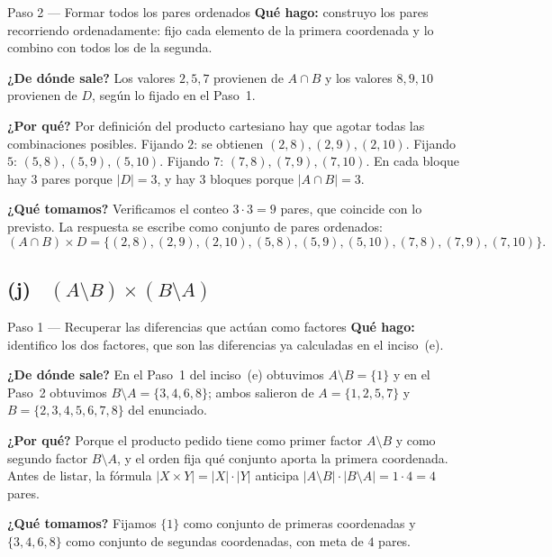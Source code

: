 \documentclass[11pt]{article}
\begin{document}
\begin{paso}{Paso 2 --- Formar todos los pares ordenados}
\textbf{Qué hago:} construyo los pares recorriendo ordenadamente: fijo cada elemento de la
primera coordenada y lo combino con todos los de la segunda.

\textbf{¿De dónde sale?} Los valores $2,5,7$ provienen de $A\cap B$ y los valores $8,9,10$
provienen de $D$, según lo fijado en el Paso~1.

\textbf{¿Por qué?} Por definición del producto cartesiano hay que agotar todas las
combinaciones posibles. Fijando $2$: se obtienen $(2,8),(2,9),(2,10)$. Fijando $5$:
$(5,8),(5,9),(5,10)$. Fijando $7$: $(7,8),(7,9),(7,10)$. En cada bloque hay $3$ pares porque
$|D|=3$, y hay $3$ bloques porque $|A\cap B|=3$.

\textbf{¿Qué tomamos?} Verificamos el conteo $3\cdot 3=9$ pares, que coincide con lo previsto.
La respuesta se escribe como conjunto de pares ordenados:
\[
(A\cap B)\times D=\bigl\{(2,8),(2,9),(2,10),(5,8),(5,9),(5,10),(7,8),(7,9),(7,10)\bigr\}.
\]
\end{paso}

\subsection*{(j) \ $(A\setminus B)\times(B\setminus A)$}

\begin{paso}{Paso 1 --- Recuperar las diferencias que actúan como factores}
\textbf{Qué hago:} identifico los dos factores, que son las diferencias ya calculadas en el
inciso~(e).

\textbf{¿De dónde sale?} En el Paso~1 del inciso~(e) obtuvimos $A\setminus B=\{1\}$ y en el
Paso~2 obtuvimos $B\setminus A=\{3,4,6,8\}$; ambos salieron de $A=\{1,2,5,7\}$ y
$B=\{2,3,4,5,6,7,8\}$ del enunciado.

\textbf{¿Por qué?} Porque el producto pedido tiene como primer factor $A\setminus B$ y como
segundo factor $B\setminus A$, y el orden fija qué conjunto aporta la primera coordenada.
Antes de listar, la fórmula $|X\times Y|=|X|\cdot|Y|$ anticipa
$|A\setminus B|\cdot|B\setminus A|=1\cdot 4=4$ pares.

\textbf{¿Qué tomamos?} Fijamos $\{1\}$ como conjunto de primeras coordenadas y
$\{3,4,6,8\}$ como conjunto de segundas coordenadas, con meta de $4$ pares.
\end{paso}
\end{document}
